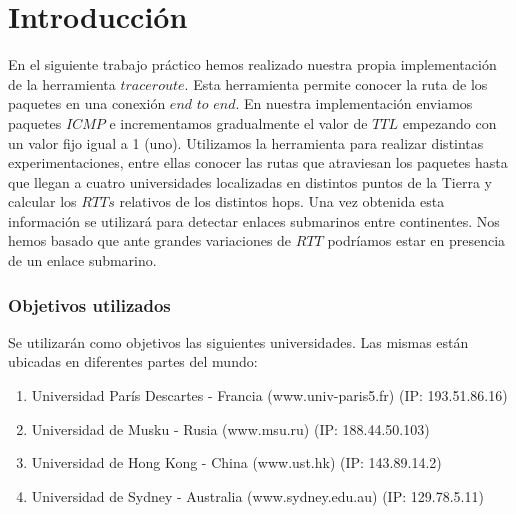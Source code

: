 \section{Introducción}

En el siguiente trabajo práctico hemos realizado nuestra propia implementación de la herramienta $traceroute$.
Esta herramienta permite conocer la ruta de los paquetes en una conexión $end$ $to$ $end$. 
En nuestra implementación enviamos paquetes $ICMP$ e incrementamos gradualmente el valor de $TTL$ empezando con un valor fijo igual a 1 (uno). 
Utilizamos la herramienta para realizar distintas experimentaciones, entre ellas conocer las rutas que atraviesan los paquetes hasta que 
llegan a cuatro universidades localizadas en distintos puntos de la Tierra y calcular los $RTTs$ relativos de los distintos hops.
Una vez obtenida esta información se utilizará para detectar enlaces submarinos entre continentes. Nos hemos basado que ante grandes variaciones
de $RTT$ podríamos estar en presencia de un enlace submarino.

\subsubsection{Objetivos utilizados}
Se utilizarán como objetivos las siguientes universidades. Las mismas están ubicadas en diferentes partes del mundo:
\begin{enumerate}
\item Universidad París Descartes - Francia (www.univ-paris5.fr) (IP: 193.51.86.16)
\item Universidad de Musku - Rusia (www.msu.ru) (IP: 188.44.50.103)
\item Universidad de Hong Kong - China (www.ust.hk) (IP: 143.89.14.2)
\item Universidad de Sydney - Australia (www.sydney.edu.au) (IP: 129.78.5.11)
\end{enumerate}


